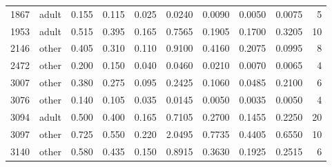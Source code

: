 \documentclass[12pt]{article}
\begin{document}
\begin{table}[!h]
\begin{tabular}{r l r r r r r r r r}
			1867 & adult & 0.155 & 0.115 & 0.025 & 0.0240 & 0.0090 & 0.0050 & 0.0075 & 5\\
			1953 & adult & 0.515 & 0.395 & 0.165 & 0.7565 & 0.1905 & 0.1700 & 0.3205 & 10\\
			2146 & other & 0.405 & 0.310 & 0.110 & 0.9100 & 0.4160 & 0.2075 & 0.0995 & 8\\
			2472 & other & 0.200 & 0.150 & 0.040 & 0.0460 & 0.0210 & 0.0070 & 0.0065 & 4\\
			3007 & other & 0.380 & 0.275 & 0.095 & 0.2425 & 0.1060 & 0.0485 & 0.2100 & 6\\
			3076 & other & 0.140 & 0.105 & 0.035 & 0.0145 & 0.0050 & 0.0035 & 0.0050 & 4\\
			3094 & adult & 0.500 & 0.400 & 0.165 & 0.7105 & 0.2700 & 0.1455 & 0.2250 & 20\\
			3097 & other & 0.725 & 0.550 & 0.220 & 2.0495 & 0.7735 & 0.4405 & 0.6550 & 10\\
			3140 & other & 0.580 & 0.435 & 0.150 & 0.8915 & 0.3630 & 0.1925 & 0.2515 & 6\\
			\bottomrule
		\end{tabular}
	\end{table}
	
\end{document}
